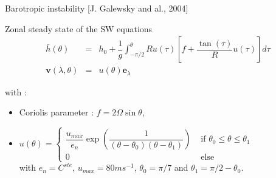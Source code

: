 \documentclass[11pt]{beamer}
\def\gint{\displaystyle\int}
\begin{document}

\begin{frame}{Barotropic instability [J. Galewsky and al., 2004]}

\begin{block}{Zonal steady state of the SW equations}
\begin{equation}
\begin{array}{rcl}
\bar{h}(\theta) & = & h_0 + \dfrac{1}{g}\gint^{\theta}_{-\pi/2} R u(\tau) \left[ f + \dfrac{\tan(\tau)}{R} u(\tau) \right] d \tau \\
\mathbf{v}(\lambda,\theta) & = & u(\theta) \mathbf{e}_{\lambda}
\end{array}
\end{equation}
\end{block}

with :

\begin{itemize}
\item Coriolis parameter : $f = 2 \Omega \sin \theta$,
\item $u(\theta)=\left\lbrace
\begin{array}{ll}
\dfrac{u_{max}}{e_n} \exp\left( \dfrac{1}{(\theta-\theta_0)(\theta-\theta_1)} \right) & \text{ if } \theta_0 \leq \theta \leq \theta_1 \\
0 & \text{ else}
\end{array}\right.$\\
 with $e_n=C^{ste}$, $u_{max} = 80 ms^{-1}$, $\theta_0 = \pi/7$ and $\theta_1 = \pi/2 - \theta_0$.
\end{itemize}
\end{frame}

\end{document}
